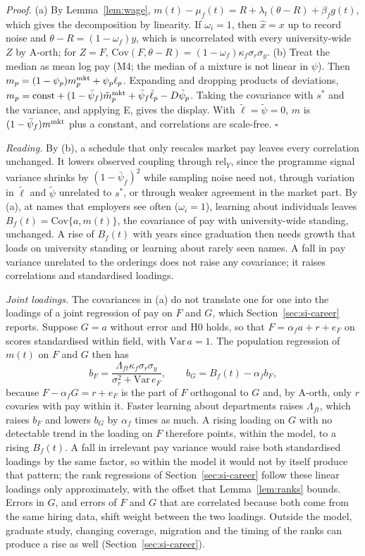\documentclass[11pt]{article}
\newcommand{\qedsq}{\hfill$\square$}
\begin{document}
\emph{Proof.} (a) By Lemma~\ref{lem:wage}, $m(t)-\mu_f(t)=R+\lambda_t(\theta-R)+\beta_fg(t)$, which gives the
decomposition by linearity. If $\omega_i=1$, then $\hat x=x$ up to record noise and $\theta-R=(1-\omega_f)y$, which
is uncorrelated with every university-wide $Z$ by A-orth; for $Z=F$, $\mathrm{Cov}(F,\theta-R)=
(1-\omega_f)\kappa_f\sigma_r\sigma_y$. (b) Treat the median as mean log pay (M4; the median of a mixture is not linear in $\psi$). Then
$m_p=(1-\psi_p)m^{\rm mkt}_p+\psi_p\ell_p$. Expanding and dropping products of deviations,
$m_p=\text{const}+(1-\bar\psi_f)\tilde m^{\rm mkt}_p+\bar\psi_f\tilde\ell_p-D\tilde\psi_p$. Taking the covariance
with $s^*$ and the variance, and applying E, gives the display. With $\tilde\ell=\tilde\psi=0$, $m$ is
$(1-\bar\psi_f)m^{\rm mkt}$ plus a constant, and correlations are scale-free. \qedsq

\emph{Reading.} By (b), a schedule that only rescales market pay leaves every correlation unchanged. It lowers
observed coupling through $\mathrm{rel}_Y$, since the programme signal variance shrinks by $(1-\bar\psi_f)^2$
while sampling noise need not, through variation in $\tilde\ell$ and $\tilde\psi$ unrelated to $s^*$, or through
weaker agreement in the market part. By (a), at names that employers see often ($\omega_i=1$), learning about
individuals leaves $B_f(t)=\mathrm{Cov}\{a,m(t)\}$, the covariance of pay with university-wide standing,
unchanged. A rise of $B_f(t)$ with years since graduation then needs growth that loads on university standing or
learning about rarely seen names. A fall in pay variance unrelated to the orderings does not raise any covariance; it
raises correlations and standardised loadings.

\emph{Joint loadings.} The covariances in (a) do not translate one for one into the loadings of a joint regression of
pay on $F$ and $G$, which Section~\ref{sec:si-career} reports. Suppose $G=a$ without error and H0 holds, so that
$F=\alpha_fa+r+e_F$ on scores standardised within field, with $\mathrm{Var}\,a=1$. The population regression of
$m(t)$ on $F$ and $G$ then has
\[
b_F=\frac{\Lambda_{ft}\kappa_f\sigma_r\sigma_y}{\sigma_r^2+\mathrm{Var}\,e_F},\qquad b_G=B_f(t)-\alpha_fb_F,
\]
because $F-\alpha_fG=r+e_F$ is the part of $F$ orthogonal to $G$ and, by A-orth, only $r$ covaries with pay within
it. Faster learning about departments raises $\Lambda_{ft}$, which raises $b_F$ and lowers $b_G$ by $\alpha_f$ times
as much. A rising loading on $G$ with no detectable trend in the loading on $F$ therefore points, within the model, to a rising $B_f(t)$.
A fall in irrelevant pay variance would raise both standardised loadings by the same factor, so within the model it
would not by itself produce that pattern; the rank regressions of Section~\ref{sec:si-career} follow these linear
loadings only approximately, with the offset that Lemma~\ref{lem:ranks} bounds. Errors in $G$, and errors of $F$ and $G$ that are correlated because both come from the same
hiring data, shift weight between the two loadings. Outside the model, graduate study, changing coverage, migration
and the timing of the ranks can produce a rise as well (Section~\ref{sec:si-career}).
\end{document}
